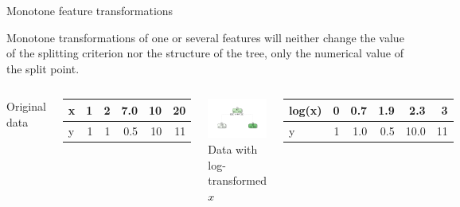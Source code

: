 \begin{vbframe}{Monotone feature transformations}

Monotone transformations of one or several features will neither change the value of the splitting criterion nor the structure of the tree,  only the numerical value of the split point.
\vspace{0.5cm}
\begin{columns}[T]
Original data
\begin{knitrout}\scriptsize
{}\color{fgcolor}
\begin{tabular}{l|r|r|r|r|r}
\hline
x & 1 & 2 & 7.0 & 10 & 20\\
\hline
y & 1 & 1 & 0.5 & 10 & 11\\
\hline
\end{tabular}


\end{knitrout}
\includegraphics[width = \textwidth]{figure/cart_splitcomp_1}
Data with log-transformed $x$
\begin{knitrout}\scriptsize
{}\color{fgcolor}
\begin{tabular}{l|r|r|r|r|r}
\hline
log(x) & 0 & 0.7 & 1.9 & 2.3 & 3\\
\hline
y & 1 & 1.0 & 0.5 & 10.0 & 11\\
\hline
\end{tabular}



\end{knitrout}
\end{columns}
\end{vbframe}
